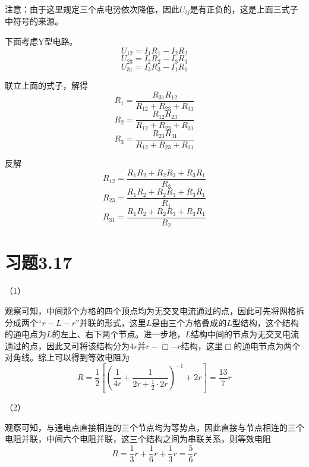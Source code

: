 \documentclass{SCIS2020cn}
\begin{document}
注意：由于这里规定三个点电势依次降低，因此$U_{ij}$是有正负的，这是上面三式子中符号的来源。

下面考虑Y型电路。
\begin{equation}
    U_{12}=I_1R_1-I_2R_2
\end{equation}
\begin{equation}
    U_{23}=I_2R_2-I_3R_3
\end{equation}
\begin{equation}
    U_{31}=I_3R_3-I_1R_1
\end{equation}

联立上面的式子，解得
\begin{equation}
    R_1=\frac{R_{31}R_{12}}{R_{12}+R_{23}+R_{31}}
\end{equation}
\begin{equation}
    R_2=\frac{R_{12}R_{23}}{R_{12}+R_{23}+R_{31}}
\end{equation}
\begin{equation}
    R_3=\frac{R_{23}R_{31}}{R_{12}+R_{23}+R_{31}}
\end{equation}

反解
\begin{equation}
    R_{12}=\frac{R_1R_2+R_2R_3+R_3R_1}{R_3}
\end{equation}
\begin{equation}
    R_{23}=\frac{R_1R_2+R_2R_3+R_3R_1}{R_1}
\end{equation}
\begin{equation}
    R_{31}=\frac{R_1R_2+R_2R_3+R_3R_1}{R_2}
\end{equation}

\section{习题3.17}
（1）

观察可知，中间那个方格的四个顶点均为无交叉电流通过的点，因此可先将网格拆分成两个“$r-L-r$”并联的形式，这里$L$是由三个方格叠成的$L$型结构，这个结构的通电点为$L$的左上、右下两个节点。进一步地，$L$结构中间的节点为无交叉电流通过的点，因此又可将该结构分为$4r$并$r-\Box-r$结构，这里$\Box$的通电节点为两个对角线。综上可以得到等效电阻为
\begin{equation}
    R=\frac{1}{2}\left[\left(\frac{1}{4r}+\frac{1}{2r+\frac{1}{2}·2r}\right)^{-1}+2r\right]=\frac{13}{7}r
\end{equation}

（2）

观察可知，与通电点直接相连的三个节点均为等势点，因此直接与节点相连的三个电阻并联，中间六个电阻并联，这三个结构之间为串联关系，则等效电阻
\begin{equation}
    R=\frac{1}{3}r+\frac{1}{6}r+\frac{1}{3}r=\frac{5}{6}r
\end{equation}
\end{document}
